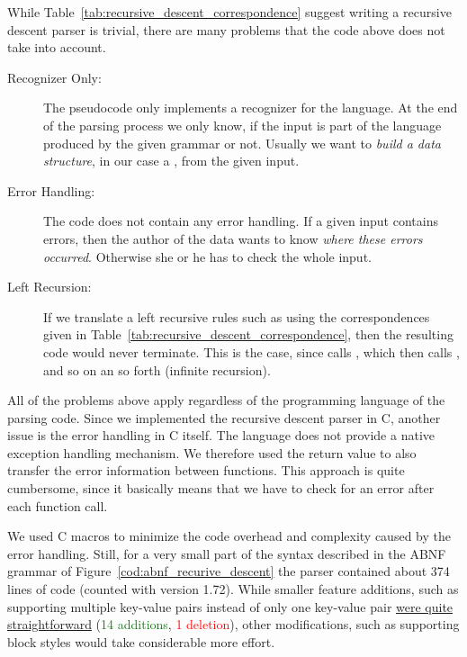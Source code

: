 While Table~\ref{tab:recursive_descent_correspondence} suggest writing a recursive descent parser is trivial, there are many problems that the code above does not take into account.

\begin{description}
  \item [Recognizer Only:] The pseudocode only implements a recognizer for the language. At the end of the parsing process we only know, if the input is part of the language produced by the given grammar or not. Usually we want to \emph{build a data structure}, in our case a , from the given input.

  \item [Error Handling:] The code does not contain any error handling. If a given input contains errors, then the author of the  data wants to know \emph{where these errors occurred}. Otherwise she or he has to check the whole input.

  \item [Left Recursion:] If we translate a left recursive rules such as  using the correspondences given in Table~\ref{tab:recursive_descent_correspondence}, then the resulting code would never terminate. This is the case, since  calls , which then calls , and so on an so forth (infinite recursion).
\end{description}

All of the problems above apply regardless of the programming language of the parsing code. Since we implemented the recursive descent parser in C, another issue is the error handling in C itself. The language does not provide a native exception handling mechanism. We therefore used the return value to also transfer the error information between functions. This approach is quite cumbersome, since it basically means that we have to check for an error after each function call.

We used C macros to minimize the code overhead and complexity caused by the error handling. Still, for a very small part of the  syntax described in the ABNF grammar of Figure~\ref{cod:abnf_recurive_descent} the parser contained about 374 lines of code (counted with  version 1.72). While smaller feature additions, such as supporting multiple key-value pairs instead of only one key-value pair \href{https://github.com/ElektraInitiative/libelektra/commit/17aa7a6ea5d9261287104213dcba67f4d0a0fcbc}{were quite straightforward} (\textcolor{Green}{14 additions}, \textcolor{Red}{1 deletion}), other modifications, such as supporting block styles would take considerable more effort.


